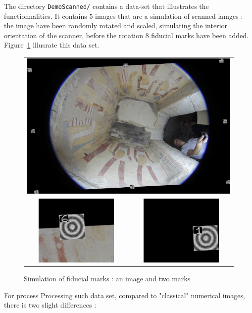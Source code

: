 The directory {\tt DemoScanned/} contains a data-set that illustrates the
functionnalities. It contains $5$ images that are a simulation of scanned
iamges : the image have been randomly rotated and scaled, simulating the
interior orientation of the scanner, before the rotation $8$  fiducial marks have
been added. Figure~\ref{ImFid} illusrate this data set.


\begin{figure}
\begin{tabular}{||c|c||}
   \hline \hline
   \multicolumn{2}{c|}{\includegraphics[width=120mm]{FIGS/Niche/ImGlob.jpg}} \\
   \includegraphics[width=40mm]{FIGS/Niche/Cible1.jpg} &
   \includegraphics[width=40mm]{FIGS/Niche/Cible2.jpg}
\end{tabular}
\caption{Simulation of fiducial marks : an image and two marks }
\label{ImFid}
\end{figure}


For process Processing such  data set, compared to "classical" numerical images,
there is two slight differences :

